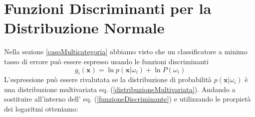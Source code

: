 
\section{Funzioni Discriminanti per la Distribuzione Normale}
Nella sezione \ref{casoMulticategoria} abbiamo visto che un classificatore a minimo tasso di errore può essere espresso usando le funzioni discriminanti
\begin{equation}\label{funzioneDiscriminante}
g_i(\mathbf{x}) = \ln p(\mathbf{x}|\omega_i) + \ln P(\omega_i)
\end{equation}
L'espressione può essere rivalutata se la distribuzione di probabilità $p(\mathbf{x}|\omega_i)$ è una distribuzione multivariata eq. (\ref{distribuzioneMultivariata}). Andando a sostituire all'interno dell' eq. (\ref{funzioneDiscriminante}) e utilizzando le prorpietà dei logaritmi otteniamo:

